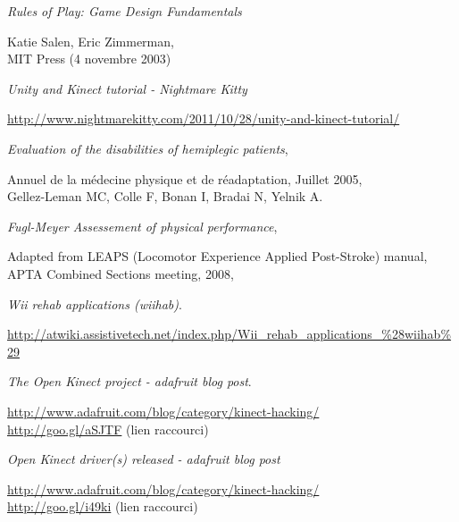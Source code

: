 \begin{thebibliography}{9}

  \emph{Rules of Play: Game Design Fundamentals}\\
  \begin{small}
  Katie Salen, Eric Zimmerman,\\
  MIT Press (4 novembre 2003)
  \end{small}

  \emph{Unity and Kinect tutorial - Nightmare Kitty}\\
  \begin{small}
  \url{http://www.nightmarekitty.com/2011/10/28/unity-and-kinect-tutorial/}
  \end{small}

  \emph{Evaluation of the disabilities of hemiplegic patients},\\
  \begin{small}
  Annuel de la médecine physique et de réadaptation, Juillet 2005,\\
  Gellez-Leman MC, Colle F, Bonan I, Bradai N, Yelnik A.\\
  \end{small}
  
  \emph{Fugl-Meyer Assessement of physical performance},\\
  \begin{small}
  Adapted from LEAPS (Locomotor Experience Applied Post-Stroke) manual,\\
  APTA Combined Sections meeting, 2008,\\
  \end{small}

  \emph{Wii rehab applications (wiihab)}.\\
  \begin{small}
  \url{http://atwiki.assistivetech.net/index.php/Wii_rehab_applications_\%28wiihab\%29}
  \end{small}
  
  \emph{The Open Kinect project - adafruit blog post}. \\
  \begin{small}
  \url{http://www.adafruit.com/blog/category/kinect-hacking/}\\
  \url{http://goo.gl/aSJTF} (lien raccourci)
  \end{small}

  \emph{Open Kinect driver(s) released - adafruit blog post}\\
  \begin{small}
  \url{http://www.adafruit.com/blog/category/kinect-hacking/}\\
  \url{http://goo.gl/i49ki} (lien raccourci)
  \end{small}


\end{thebibliography}
